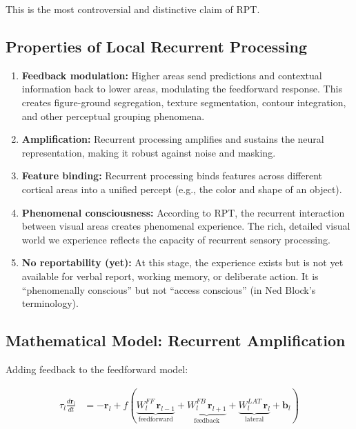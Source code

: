 \documentclass[11pt,a4paper]{report}
\begin{document}
This is the most controversial and distinctive claim of RPT.

\subsection{Properties of Local Recurrent Processing}

\begin{enumerate}[leftmargin=2em]
  \item \textbf{Feedback modulation:} Higher areas send predictions and contextual information back to lower areas, modulating the feedforward response. This creates figure-ground segregation, texture segmentation, contour integration, and other perceptual grouping phenomena.
  \item \textbf{Amplification:} Recurrent processing amplifies and sustains the neural representation, making it robust against noise and masking.
  \item \textbf{Feature binding:} Recurrent processing binds features across different cortical areas into a unified percept (e.g., the color and shape of an object).
  \item \textbf{Phenomenal consciousness:} According to RPT, the recurrent interaction between visual areas creates phenomenal experience. The rich, detailed visual world we experience reflects the capacity of recurrent sensory processing.
  \item \textbf{No reportability (yet):} At this stage, the experience exists but is not yet available for verbal report, working memory, or deliberate action. It is ``phenomenally conscious'' but not ``access conscious'' (in Ned Block's terminology).
\end{enumerate}

\subsection{Mathematical Model: Recurrent Amplification}

Adding feedback to the feedforward model:

\begin{mathbox}
\vspace{-6pt}
\begin{align}
  \tau_l \frac{d\mathbf{r}_l}{dt} &= -\mathbf{r}_l + f\!\left(\underbrace{W_l^{FF}\, \mathbf{r}_{l-1}}_{\text{feedforward}} + \underbrace{W_l^{FB}\, \mathbf{r}_{l+1}}_{\text{feedback}} + \underbrace{W_l^{LAT}\, \mathbf{r}_{l}}_{\text{lateral}} + \mathbf{b}_l\right) \label{eq:recurrent_model}
\end{align}
\vspace{-8pt}
\end{mathbox}
\end{document}
